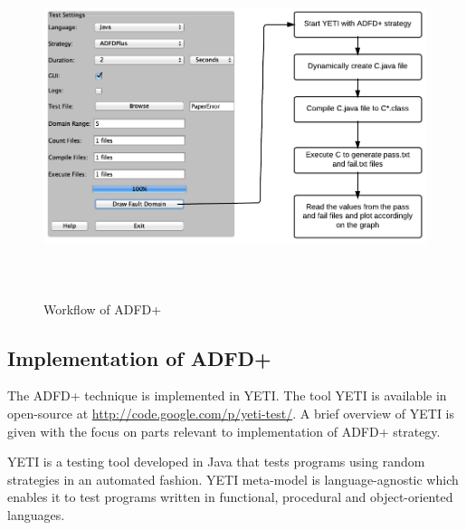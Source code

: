 
\begin{figure}[ht]
\centering
\includegraphics[width= 14cm,height=10cm]{chapter6/adfdPlusWorkflow.png}
\caption{Workflow of ADFD+}
\label{fig:Workflow}
\end{figure}



\subsection{Implementation of ADFD+}\label{sec:intro6_4}
The ADFD+ technique is implemented in YETI. The tool YETI is available in open-source at \url{http://code.google.com/p/yeti-test/}. A brief overview of YETI is given with the focus on parts relevant to implementation of ADFD+ strategy.

YETI is a testing tool developed in Java that tests programs using random strategies in an automated fashion. YETI meta-model is language-agnostic which enables it to test 
programs written in functional, procedural and object-oriented languages. 

